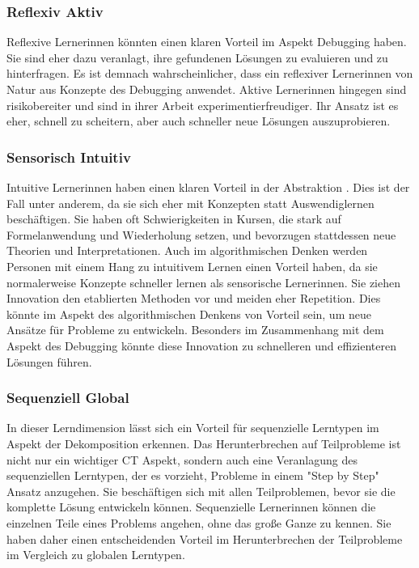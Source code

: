 \subsubsection{Reflexiv Aktiv}
Reflexive Lernerinnen könnten einen klaren Vorteil im Aspekt Debugging haben. Sie sind eher dazu veranlagt, ihre gefundenen Lösungen zu evaluieren und zu hinterfragen. Es ist demnach wahrscheinlicher, dass ein reflexiver Lernerinnen von Natur aus Konzepte des Debugging anwendet. Aktive Lernerinnen hingegen sind risikobereiter und sind in ihrer Arbeit experimentierfreudiger. Ihr Ansatz ist es eher, schnell zu scheitern, aber auch schneller neue Lösungen auszuprobieren.

\subsubsection{Sensorisch Intuitiv}
Intuitive Lernerinnen haben einen klaren Vorteil in der Abstraktion \cite{felderhandout}. Dies ist der Fall unter anderem, da sie sich eher mit Konzepten statt Auswendiglernen beschäftigen. Sie haben oft Schwierigkeiten in Kursen, die stark auf Formelanwendung und Wiederholung setzen, und bevorzugen stattdessen neue Theorien und Interpretationen.
Auch im algorithmischen Denken werden Personen mit einem Hang zu intuitivem Lernen einen Vorteil haben, da sie normalerweise Konzepte schneller lernen als sensorische Lernerinnen. Sie ziehen Innovation den etablierten Methoden vor und meiden eher Repetition. Dies könnte im Aspekt des algorithmischen Denkens von Vorteil sein, um neue Ansätze für Probleme zu entwickeln. Besonders im Zusammenhang mit dem Aspekt des Debugging könnte diese Innovation zu schnelleren und effizienteren Lösungen führen.

\subsubsection{Sequenziell Global}
In dieser Lerndimension lässt sich ein Vorteil für sequenzielle Lerntypen im Aspekt der Dekomposition erkennen. Das Herunterbrechen auf Teilprobleme ist nicht nur ein wichtiger CT Aspekt, sondern auch eine Veranlagung des sequenziellen Lerntypen, der es vorzieht, Probleme in einem "Step by Step" Ansatz anzugehen. Sie beschäftigen sich mit allen Teilproblemen, bevor sie die komplette Lösung entwickeln können. Sequenzielle Lernerinnen können die einzelnen Teile eines Problems angehen, ohne das große Ganze zu kennen. Sie haben daher einen entscheidenden Vorteil im Herunterbrechen der Teilprobleme im Vergleich zu globalen Lerntypen.

